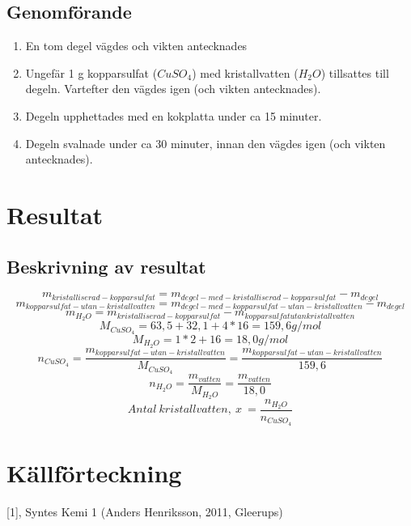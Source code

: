 \documentclass{article}
\begin{document}
	\subsection{Genomförande}
	
	\begin{enumerate}
		\item En tom degel vägdes och vikten antecknades
		\item Ungefär 1 g kopparsulfat ($CuSO_4$) med kristallvatten ($H_2O$) tillsattes till degeln. Vartefter den vägdes igen (och vikten antecknades).
		\item Degeln upphettades med en kokplatta under ca 15 minuter.
		\item Degeln svalnade under ca 30 minuter, innan den vägdes igen (och vikten antecknades). 
	\end{enumerate}
	\section{Resultat}
	\subsection{Beskrivning av resultat}
	\[m_{kristalliserad-kopparsulfat}=m_{degel-med-kristalliserad-kopparsulfat}-m_{degel}\]
	\[m_{kopparsulfat-utan-kristallvatten}=m_{degel-med-kopparsulfat-utan-kristallvatten}-m_{degel}\]
	\[m_{H_2O}=m_{kristalliserad-kopparsulfat}-m_{kopparsulfat utan kristallvatten}\]
	\[M_{CuSO_4}=63,5+32,1+4*16=159,6 g/mol\]
	\[M_{H_2O}=1*2+16=18,0 g/mol\]
	\[n_{CuSO_4}=\frac{m_{kopparsulfat-utan-kristallvatten}}{M_{CuSO_4}}=\frac{m_{kopparsulfat-utan-kristallvatten}}{159,6}\]
	\[n_{H_2O}=\frac{m_{vatten}}{M_{H_2O}}=\frac{m_{vatten}}{18,0}\]
	\[Antal\: kristallvatten,\: x \: =\frac{n_{H_2O}}{n_{CuSO_4}}\]
	
	
	\pagebreak
	\section{Källförteckning}
	[1], Syntes Kemi 1 (Anders Henriksson, 2011, Gleerups) 
	\newline[ISBN: 978-91-40-67418-0]
	\newline
	
	
	
\end{document}
